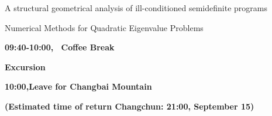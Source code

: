  {A structural geometrical analysis of ill-conditioned 
semidefinite programs}

 {Numerical Methods for Quadratic Eigenvalue Problems}

\vskip8mm \centerline{\bf 09:40-10:00, \ Coffee Break} \vskip8mm

\vskip16mm \centerline{\bf Excursion}
\vskip2mm \centerline{\bf 10:00,\quad Leave for Changbai Mountain} 
\vskip2mm  \centerline{\bf (Estimated time of return Changchun: 21:00, September 15)} \vskip16mm


